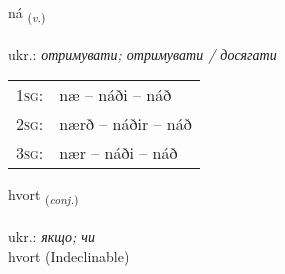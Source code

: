 \documentclass[frontgrid, backgrid]{flacards}\usepackage[]{graphicx}\usepackage[]{xcolor}
\begin{document}
{ná \small{\textsubscript{(\textit{v.})}} \\[1ex] %
\textphonetic{[nauː]} \\
ukr.: \emph{отримувати; отримувати / досягати} \\  [2ex]
\renewcommand*{\arraystretch}{0.8}
\begin{tabular}{p{1cm}l}
\textsc{1sg}: & næ -- náði -- náð \\ 
\textsc{2sg}: & nærð -- náðir -- náð \\ 
\textsc{3sg}: & nær -- náði -- náð \\ 
\end{tabular}
}


\renewcommand{\flhead}{\vskip5pt \fboxsep=0pt {\small\bfseries\footnotesize Samtenging | сполучник}}
\renewcommand{\fcfoot}{\vskip5pt \fboxsep=0pt \hspace{2pt}{\small\bfseries\footnotesize 1K}}

\renewcommand{\blhead}{\vskip5pt {\small\bfseries\footnotesize Samtenging | сполучник }}
\renewcommand{\bcfoot}{\vskip5pt \hspace{2pt}{\small\bfseries\footnotesize 1K}}


{hvort \small{\textsubscript{(\textit{conj.})}} \\[1ex]
\textphonetic{[kʰvɔr̥t]} \\
ukr.: \emph{якщо; чи} \\  [2ex]
hvort (Indeclinable)}

\renewcommand{\flhead}{\vskip5pt \fboxsep=0pt {\small\bfseries\footnotesize Lýsingarorð | прикметник}}
\renewcommand{\fcfoot}{\vskip5pt \fboxsep=0pt \hspace{2pt}{\small\bfseries\footnotesize 1K}}

\renewcommand{\blhead}{\vskip5pt {\small\bfseries\footnotesize Lýsingarorð | прикметник }}
\renewcommand{\bcfoot}{\vskip5pt \hspace{2pt}{\small\bfseries\footnotesize 1K}}
\end{document}
